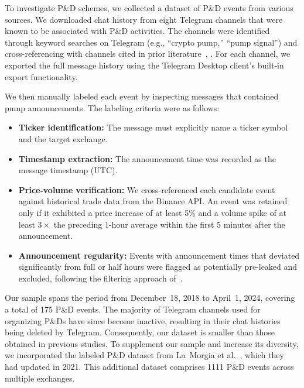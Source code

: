 \documentclass{ieeeaccess}
\begin{document}
To investigate P\&D schemes, we collected a dataset of P\&D events from various sources. We downloaded chat history from eight Telegram channels that were known to be associated with P\&D activities. The channels were identified through keyword searches on Telegram (e.g., ``crypto pump,'' ``pump signal'') and cross-referencing with channels cited in prior literature~\cite{la_morgia_pump_2020}, \cite{pd_anatomy}. For each channel, we exported the full message history using the Telegram Desktop client's built-in export functionality.

We then manually labeled each event by inspecting messages that contained pump announcements. The labeling criteria were as follows:
\begin{itemize}
    \item \textbf{Ticker identification:} The message must explicitly name a ticker symbol and the target exchange.
    \item \textbf{Timestamp extraction:} The announcement time was recorded as the message timestamp (UTC).
    \item \textbf{Price-volume verification:} We cross-referenced each candidate event against historical trade data from the Binance API. An event was retained only if it exhibited a price increase of at least 5\% and a volume spike of at least $3\times$ the preceding 1-hour average within the first 5 minutes after the announcement.
    \item \textbf{Announcement regularity:} Events with announcement times that deviated significantly from full or half hours were flagged as potentially pre-leaked and excluded, following the filtering approach of~\cite{pd_anatomy}.
\end{itemize}

Our sample spans the period from December~18, 2018 to April~1, 2024, covering a total of 175 P\&D events. The majority of Telegram channels used for organizing P\&Ds have since become inactive, resulting in their chat histories being deleted by Telegram. Consequently, our dataset is smaller than those obtained in previous studies. To supplement our sample and increase its diversity, we incorporated the labeled P\&D dataset from La~Morgia et al.~\cite{la_morgia_pump_2020}, which they had updated in 2021. This additional dataset comprises 1111 P\&D events across multiple exchanges.
\end{document}
